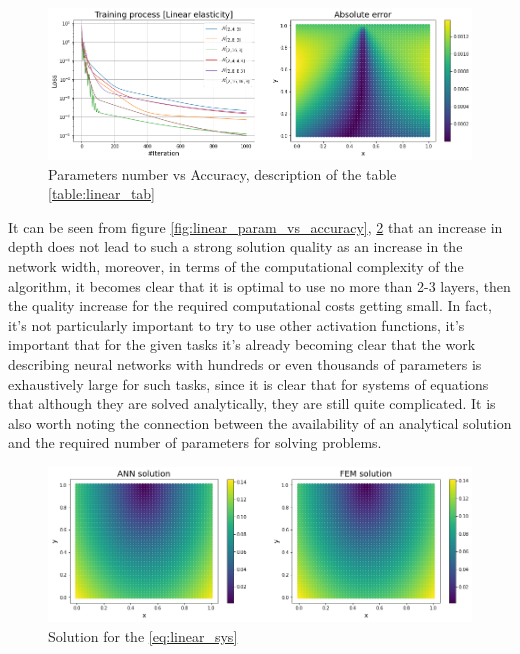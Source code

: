 \begin{figure}
	\centering
	\includegraphics[width=\textwidth]{images/chapter3/linear_simple_net_train_error.png}
	\caption{Parameters number vs Accuracy, description of the table \ref{table:linear_tab}}
	\label{fig:linear_simple_net_error_train}\tabularnewline
\end{figure}

It can be seen from figure \ref{fig:linear_param_vs_accuracy}, \ref{fig:linear_simple_net_error_train} that an increase in depth does not lead to such a strong solution quality as an increase in the network width, moreover, in terms of the computational complexity of the algorithm, it becomes clear that it is optimal to use no more than 2-3 layers, then the quality increase for the required computational costs getting small. In fact, it’s not particularly important to try to use other activation functions, it’s important that for the given tasks it’s already becoming clear that the work describing neural networks with hundreds or even thousands of parameters is exhaustively large for such tasks, since it is clear that for systems of equations that although they are solved analytically, they are still quite complicated. It is also worth noting the connection between the availability of an analytical solution and the required number of parameters for solving problems.

\begin{figure}
	\centering
	\includegraphics[width=\textwidth]{images/chapter3/linear_simple_net_solution.png}
	\caption{Solution for the \eqref{eq:linear_sys}}
	\label{fig:linear_simple_net_error_train}\tabularnewline
\end{figure}